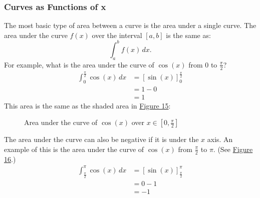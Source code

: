 \documentclass[12pt]{article}
\begin{document}
            \subsubsection{Curves as Functions of x}
                The most basic type of area between a curve is the area under a single curve. The area under the curve $f(x)$ over the interval $[a, b]$ is the same as:
                \[ \int_a^b f(x) \, dx. \]
                For example, what is the area under the curve of $\cos(x)$ from $0$ to $\frac{\pi}{2}$?
                \begin{align*}
                    \int_0^{\frac{\pi}{2}} \cos(x) \, dx &= \left[ \sin(x) \right]_0^{\frac{\pi}{2}} \\[6pt]
                    &= 1 - 0 \\
                    &= 1
                \end{align*}
                This area is the same as the shaded area in \hyperref[fig:auccosx1]{Figure 15}:

                \begin{figure}[H]
                    \begin{center}
                        \caption{Area under the curve of $\cos(x)$ over $x \in [0, \frac{\pi}{2}]$}
                        \label{fig:auccosx1}
                    \end{center}
                \end{figure}

                The area under the curve can also be negative if it is under the $x$ axis. An example of this is the area under the curve of $\cos(x)$ from $\frac{\pi}{2}$ to $\pi$. (See \hyperref[fig:auccosx2]{Figure 16}.)
                \begin{align*}
                    \int_{\frac{\pi}{2}}^\pi \cos(x) \, dx &= \left[ \sin(x) \right]_{\frac{\pi}{2}}^\pi \\[6pt]
                    &= 0 - 1 \\
                    &= -1
                \end{align*}
\end{document}
